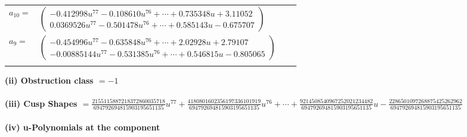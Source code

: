 \documentclass[1p]{elsarticle_modified}
\theoremstyle{definition}
\begin{document}
\begin{tabular}{m{7pt} m{180pt} m{7pt} m{180pt} }
\flushright $a_{10}=$&$\begin{pmatrix}-0.412998 u^{77}-0.108610 u^{76}+\cdots+0.735348 u+3.11052\\0.0369526 u^{77}-0.501478 u^{76}+\cdots+0.585143 u-0.675707\end{pmatrix}$ \\
\flushright $a_{9}=$&$\begin{pmatrix}-0.454996 u^{77}-0.635848 u^{76}+\cdots+2.02928 u+2.79107\\-0.00885144 u^{77}-0.531385 u^{76}+\cdots+0.546815 u-0.805065\end{pmatrix}$\\&\end{tabular}
\flushleft \textbf{(ii) Obstruction class $= -1$}\\~\\
\flushleft \textbf{(iii) Cusp Shapes $= \frac{2155115887218372860035718}{694792694815903195651135} u^{77}+\frac{4180801602356197336101919}{694792694815903195651135} u^{76}+\cdots+\frac{9214508540967252021234482}{694792694815903195651135} u-\frac{2286501097268875425262962}{694792694815903195651135}$}\\~\\
\newpage\renewcommand{\arraystretch}{1}
\flushleft \textbf{(iv) u-Polynomials at the component}\newline \\
\end{document}
